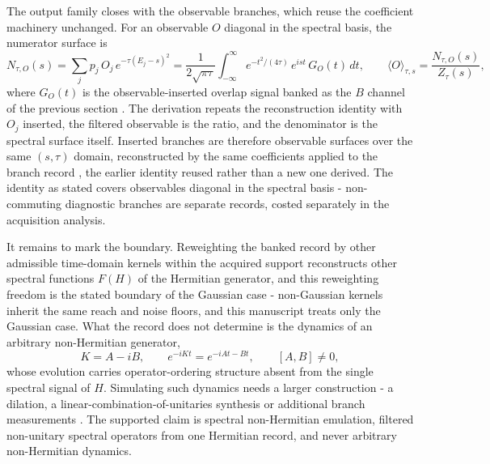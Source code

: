 The output family closes with the observable branches, which reuse the coefficient machinery unchanged. For an observable $O$ diagonal in the spectral basis, the numerator surface is
\begin{equation}\label{def:observable-surfaces}
N_{\tau,O}(s)=\sum_j p_j\,O_j\,e^{-\tau(E_j-s)^{2}}=\frac{1}{2\sqrt{\pi\tau}}\int_{-\infty}^{\infty}e^{-t^{2}/(4\tau)}\,e^{ist}\,G_O(t)\,dt,\qquad \langle O\rangle_{\tau,s}=\frac{N_{\tau,O}(s)}{Z_\tau(s)},
\end{equation}
where $G_O(t)$ is the observable-inserted overlap signal banked as the $B$ channel of the previous section \cite{knill1998power}. The derivation repeats the reconstruction identity with $O_j$ inserted, the filtered observable is the ratio, and the denominator is the spectral surface itself. Inserted branches are therefore observable surfaces over the same $(s,\tau)$ domain, reconstructed by the same coefficients applied to the branch record \cite{chan2025shadow}, the earlier identity reused rather than a new one derived. The identity as stated covers observables diagonal in the spectral basis - non-commuting diagnostic branches are separate records, costed separately in the acquisition analysis.

It remains to mark the boundary. Reweighting the banked record by other admissible time-domain kernels within the acquired support reconstructs other spectral functions $F(H)$ of the Hermitian generator, and this reweighting freedom is the stated boundary of the Gaussian case - non-Gaussian kernels inherit the same reach and noise floors, and this manuscript treats only the Gaussian case. What the record does not determine is the dynamics of an arbitrary non-Hermitian generator,
\begin{equation}\label{irf:non-hermitian-emulation-boundary}
K=A-iB,\qquad e^{-iKt}=e^{-iAt-Bt},\qquad [A,B]\neq 0,
\end{equation}
whose evolution carries operator-ordering structure absent from the single spectral signal of $H$. Simulating such dynamics needs a larger construction - a dilation, a linear-combination-of-unitaries synthesis or additional branch measurements \cite{leamer2024emulation,kamakari2022digital}. The supported claim is spectral non-Hermitian emulation, filtered non-unitary spectral operators from one Hermitian record, and never arbitrary non-Hermitian dynamics.
